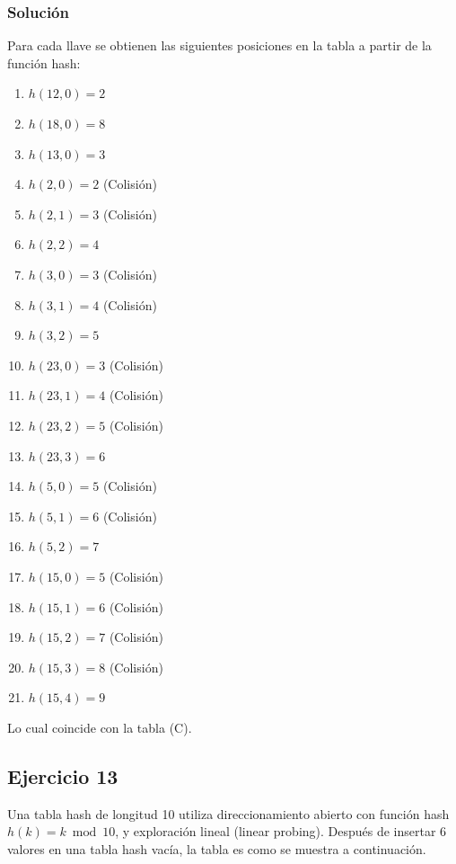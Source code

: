 \documentclass{article}
\begin{document}
\subsubsection*{Solución}
Para cada llave se obtienen las siguientes posiciones en la tabla a partir de la función hash:
\begin{multicols}{2}
\begin{enumerate}[topsep=0pt, parsep=0pt, itemsep=2pt]
    \item $h(12, 0) = 2$
    \item $h(18, 0) = 8$
    \item $h(13, 0) = 3$
    \item $h(2 , 0) = 2$ (Colisión)
    \item $h(2 , 1) = 3$ (Colisión)
    \item $h(2 , 2) = 4$
    \item $h(3 , 0) = 3$ (Colisión)
    \item $h(3 , 1) = 4$ (Colisión)
    \item $h(3 , 2) = 5$
    \item $h(23, 0) = 3$ (Colisión)
    \item $h(23, 1) = 4$ (Colisión)
    \item $h(23, 2) = 5$ (Colisión)
    \item $h(23, 3) = 6$
    \item $h(5 , 0) = 5$ (Colisión)
    \item $h(5 , 1) = 6$ (Colisión)
    \item $h(5 , 2) = 7$
    \item $h(15, 0) = 5$ (Colisión)
    \item $h(15, 1) = 6$ (Colisión)
    \item $h(15, 2) = 7$ (Colisión)
    \item $h(15, 3) = 8$ (Colisión)
    \item $h(15, 4) = 9$
\end{enumerate}
\end{multicols}
Lo cual coincide con la tabla (C).


\subsection*{Ejercicio 13}
Una tabla hash de longitud 10 utiliza direccionamiento abierto con función hash $h(k)=k \bmod 10$, y exploración lineal (linear probing). Después de insertar 6 valores en una tabla hash vacía, la tabla es como se muestra a continuación.
\end{document}
